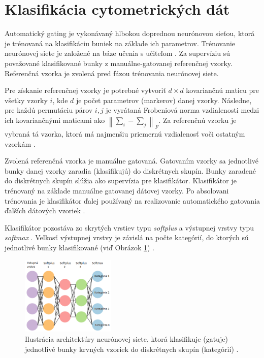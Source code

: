 \section{Klasifikácia cytometrických dát}
\label{feed-forward-classifikator}

Automatický gating je vykonávaný hlbokou doprednou neurónovou sieťou, ktorá je trénovaná na klasifikáciu buniek na základe ich parametrov. Trénovanie neurónovej siete je založené na báze učenia s učiteľom \cite{Goh1995}. Za supervíziu sú považované klasifikované bunky z  manuálne-gatovanej referenčnej vzorky. Referenčná vzorka je zvolená pred fázou trénovania neurónovej siete. 

Pre získanie referenčnej vzorky je potrebné vytvoriť $d \times d$ kovariančnú maticu pre všetky vzorky $i$, kde $d$ je počet parametrov (markerov) danej vzorky. Následne, pre každú permutáciu párov $i,j$ je vyrátaná Frobeniová norma \cite{formNorm} vzdialenosti medzi ich kovariančnými maticami ako $\left\lVert\sum_{i}-\sum_{j}\right\rVert_F$. Za referenčnú vzorku je vybraná tá vzorka, ktorá má najmenšiu priemernú vzdialenosť voči ostatným vzorkám \cite{Li2017}.

Zvolená referenčná vzorka je manuálne gatovaná. Gatovaním vzorky sa jednotlivé bunky danej vzorky zaradia (klasifikujú) do diskrétnych skupín. Bunky zaradené do diskrétnych skupín slúžia ako supervízia pre klasifikátor. Klasifikátor je trénovaný na základe manuálne gatovanej dátovej vzorky. Po absolovani trénovania je klasifikátor ďalej používaný na realizovanie automatického gatovania ďalších dátových vzoriek \cite{Li2017}.

Klasifikátor pozostáva zo skrytých vrstiev typu \textit{softplus} \cite{Goh1995} a výstupnej vrstvy typu \textit{softmax} \cite{Goh1995}. Veľkosť výstupnej vrstvy je závislá na počte kategórií, do ktorých sú jednotlivé bunky klasifikované (viď Obrázok \ref{cell_classifier_arch}) \cite{Li2017}.

\begin{figure}
\centerline{\includegraphics[width=0.4\textwidth]{images/cell_classifier_arch.png}}
\caption[Architektúra bunkového klasifikátora]{Ilustrácia architektúry neurónovej siete, ktorá klasifikuje (gatuje) jednotlivé bunky krvných vzoriek do diskrétnych skupín (kategórií) \cite{Li2017}.}
\label{cell_classifier_arch}
\end{figure}

